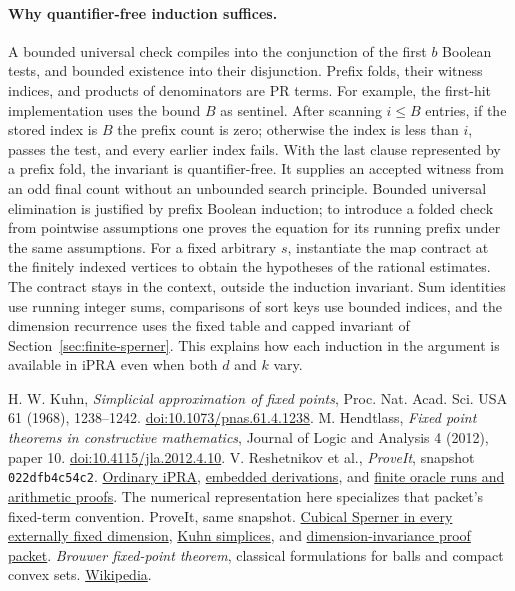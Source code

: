 \documentclass[11pt,letterpaper]{article}
\theoremstyle{claim}\newtheorem{theorem}{Theorem}\newtheorem{lemma}[theorem]{Lemma}
\newcommand{\repo}[2]{\href{https://github.com/VladimirReshetnikov/ProveIt/blob/022dfb4c54c22782f927a903f25bcf6491b7eba2/Logic/PrimitiveRecursiveArithmetic/#1}{#2}}
\begin{document}
\paragraph{Why quantifier-free induction suffices.}
A bounded universal check compiles into the conjunction of the first $b$
Boolean tests, and bounded existence into their disjunction. Prefix
folds, their witness indices, and products of denominators are PR terms.
For example, the first-hit implementation uses the bound $B$ as sentinel.
After scanning $i\le B$ entries, if the stored index is $B$ the prefix
count is zero; otherwise the index is less than $i$, passes the test, and
every earlier index fails. With the last clause represented by a prefix
fold, the invariant is quantifier-free. It supplies an accepted witness from
an odd final count without an unbounded search principle. Bounded universal
elimination is justified by prefix Boolean induction; to introduce a folded
check from pointwise assumptions one proves the equation for its running
prefix under the same assumptions. For a fixed arbitrary $s$,
instantiate the map contract at the finitely indexed vertices to obtain
the hypotheses of the rational estimates. The contract stays in the
context, outside the induction invariant. Sum identities use running
integer sums, comparisons of sort keys use bounded indices, and the
dimension recurrence uses the fixed table and capped invariant of
Section~\ref{sec:finite-sperner}. This explains how each induction in the
argument is available in iPRA even when both $d$ and $k$ vary.


\begin{thebibliography}{9}\small
{} H. W. Kuhn, \emph{Simplicial approximation of fixed points},
Proc. Nat. Acad. Sci. USA 61 (1968), 1238--1242.
\href{https://doi.org/10.1073/pnas.61.4.1238}{doi:10.1073/pnas.61.4.1238}.
 M. Hendtlass, \emph{Fixed point theorems in constructive
mathematics}, Journal of Logic and Analysis 4 (2012), paper 10.
\href{https://doi.org/10.4115/jla.2012.4.10}{doi:10.4115/jla.2012.4.10}.
 V. Reshetnikov et al., \emph{ProveIt}, snapshot
\texttt{022dfb4c54c2}. \repo{README.md}{Ordinary iPRA},
\repo{Derivations/README.md}{embedded derivations}, and
\repo{docs/proofs/analysis/ipra_constructive_analysis_2026-11-20/framework.tex}{finite oracle runs and arithmetic proofs}.
The numerical representation here specializes that packet's fixed-term convention.
 ProveIt, same snapshot.
\repo{Derivations/Lean/IPRADerivations/Topology/SpernerCube.lean}{Cubical Sperner in every externally fixed dimension},
\repo{Derivations/Lean/IPRADerivations/Topology/KuhnSimplices.lean}{Kuhn simplices},
and \repo{docs/proofs/topology/dimension_invariance_ipra/README.md}{dimension-invariance proof packet}.
 \emph{Brouwer fixed-point theorem}, classical formulations
for balls and compact convex sets.
\href{https://en.wikipedia.org/wiki/Brouwer_fixed-point_theorem}{Wikipedia}.
\end{thebibliography}
\end{document}
